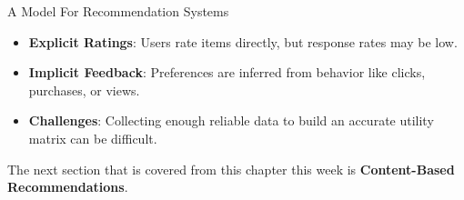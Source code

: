 \begin{notes}{A Model For Recommendation Systems}
    \begin{highlight}
        \begin{itemize}
            \item \textbf{Explicit Ratings}: Users rate items directly, but response rates may be low.
            \item \textbf{Implicit Feedback}: Preferences are inferred from behavior like clicks, purchases, or views.
            \item \textbf{Challenges}: Collecting enough reliable data to build an accurate utility matrix can be difficult.
        \end{itemize}
    \end{highlight}
\end{notes}

The next section that is covered from this chapter this week is \textbf{Content-Based Recommendations}.

